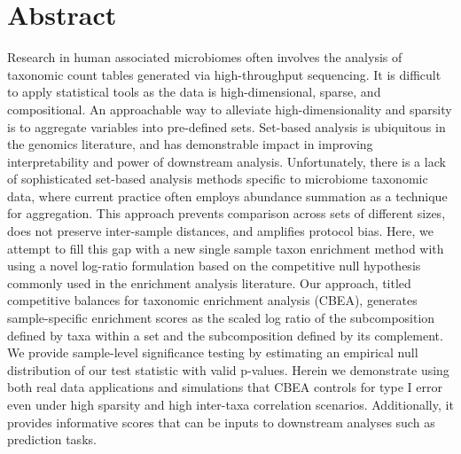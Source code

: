 \documentclass[10pt,letterpaper]{article}
\begin{document}
\section*{Abstract}
Research in human associated microbiomes often involves the analysis of taxonomic count tables generated via high-throughput sequencing. It is difficult to apply statistical tools as the data is high-dimensional, sparse, and compositional. An approachable way to alleviate high-dimensionality and sparsity is to aggregate variables into pre-defined sets. Set-based analysis is ubiquitous in the genomics literature, and has demonstrable impact in improving interpretability and power of downstream analysis. Unfortunately, there is a lack of sophisticated set-based analysis methods specific to microbiome taxonomic data, where current practice often employs abundance summation as a technique for aggregation. This approach prevents comparison across sets of different sizes, does not preserve inter-sample distances, and amplifies protocol bias. Here, we attempt to fill this gap with a new single sample taxon enrichment method with using a novel log-ratio formulation based on the competitive null hypothesis commonly used in the enrichment analysis literature. Our approach, titled competitive balances for taxonomic enrichment analysis (CBEA), generates sample-specific enrichment scores as the scaled log ratio of the subcomposition defined by taxa within a set and the subcomposition defined by its complement. We provide sample-level significance testing by estimating an empirical null distribution of our test statistic with valid p-values. Herein we demonstrate using both real data applications and simulations that CBEA controls for type I error even under high sparsity and high inter-taxa correlation scenarios. Additionally, it provides informative scores that can be inputs to downstream analyses such as prediction tasks. 


\end{document}
